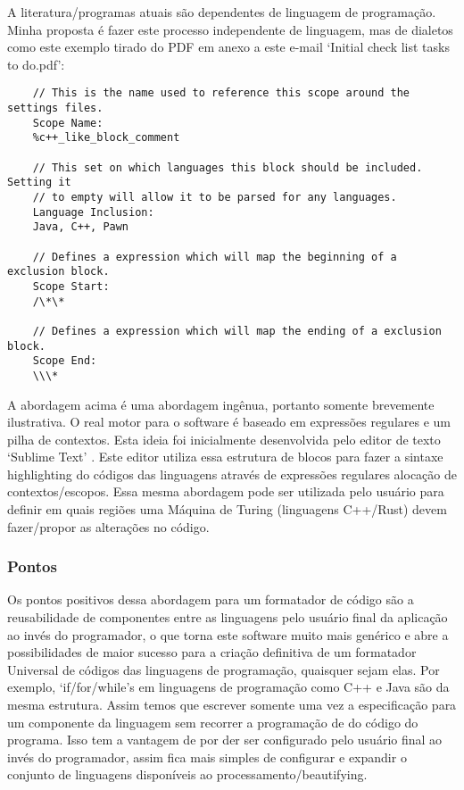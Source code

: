 \begin{englishtext}
    A literatura/programas atuais são dependentes de linguagem de programação. Minha proposta é
    fazer este processo independente de linguagem, mas de dialetos como este exemplo tirado do PDF
    em anexo a este e-mail `Initial check list tasks to do.pdf':

    \begin{lstlisting}
    // This is the name used to reference this scope around the settings files.
    Scope Name:
    %c++_like_block_comment

    // This set on which languages this block should be included. Setting it
    // to empty will allow it to be parsed for any languages.
    Language Inclusion:
    Java, C++, Pawn

    // Defines a expression which will map the beginning of a exclusion block.
    Scope Start:
    /\*\*

    // Defines a expression which will map the ending of a exclusion block.
    Scope End:
    \\\*
    \end{lstlisting}
    \vspace*{-4mm}

    A abordagem acima é uma abordagem ingênua, portanto somente brevemente ilustrativa. O real motor
    para o software é baseado em expressões regulares e um pilha de contextos. Esta ideia foi
    inicialmente desenvolvida pelo editor de texto `Sublime Text' \cite{Skinner}. Este editor
    utiliza essa estrutura de blocos para fazer a sintaxe highlighting do códigos das linguagens
    através de expressões regulares alocação de contextos/escopos. Essa mesma abordagem pode ser
    utilizada pelo usuário para definir em quais regiões uma Máquina de Turing (linguagens C++/Rust)
    devem fazer/propor as alterações no código.


\subsubsection{Pontos}

    Os pontos positivos dessa abordagem para um formatador de código são a reusabilidade de
    componentes entre as linguagens pelo usuário final da aplicação ao invés do programador, o que
    torna este software muito mais genérico e abre a possibilidades de maior sucesso para a criação
    definitiva de um formatador Universal de códigos das linguagens de programação, quaisquer sejam
    elas. Por exemplo, `if/for/while'\textquotesingle s em linguagens de programação como C++ e Java
    são da mesma estrutura. Assim temos que escrever somente uma vez a especificação para um
    componente da linguagem sem recorrer a programação de do código do programa. Isso tem a vantagem
    de por der ser configurado pelo usuário final ao invés do programador, assim fica mais simples
    de configurar e expandir o conjunto de linguagens disponíveis ao processamento/beautifying.


\end{englishtext}
